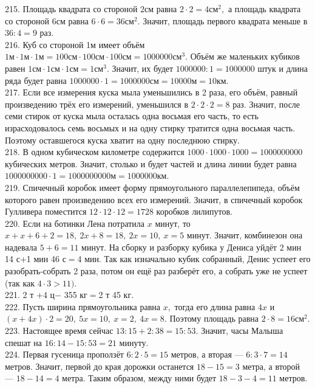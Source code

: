 215. Площадь квадрата со стороной 2см равна $2\cdot2=4\text{см}^2,$ а площадь квадрата со стороной 6см равна $6\cdot6=36\text{см}^2.$ Значит, площадь первого квадрата меньше в $36:4=9$ раз.\\
216. Куб со стороной 1м имеет объём $1\text{м}\cdot1\text{м}\cdot1\text{м}=100\text{см}\cdot100\text{см}\cdot100\text{см}=1000000\text{см}^3.$ Объём же маленьких кубиков равен $1\text{см}\cdot1\text{см}\cdot1\text{см}=1\text{см}^3.$ Значит, их будет $1000000:1=1000000$ штук и длина ряда будет равна
$1000000\cdot1=1000000\text{см}=10000\text{м}=10$км.\\
217. Если все измерения куска мыла уменьшились в 2 раза, его объём, равный произведению трёх его измерений, уменьшился в $2\cdot2\cdot2=8$ раз. Значит, после семи стирок от куска мыла осталась одна восьмая его часть, то есть израсходовалось семь восьмых и на одну стирку тратится одна восьмая часть. Поэтому оставшегося куска хватит на одну последнюю стирку.\\
218. В одном кубическом километре содержится $1000\cdot1000\cdot1000=1000000000$ кубических метров. Значит, столько и будет частей и длина линии будет равна $1000000000\cdot1=1000000000$м$=1000000$км.\\
219. Спичечный коробок имеет форму прямоугольного параллелепипеда, объём которого равен произведению всех его измерений. Значит, в спичечный коробок Гулливера поместится $12\cdot12\cdot12=1728$ коробков лилипутов.\\
220. Если на ботинки Лена потратила $x$ минут, то  $x+x+6+2=18,\ 2x+8=18,\ 2x=10,\ x=5$ минут. Значит, комбинезон она надевала $5+6=11$ минут. На сборку и разборку кубика у Дениса уйдёт 2 мин 14 с$+$1 мин 46 с$=$4 мин. Так как изначально кубик собранный, Денис успеет его разобрать-собрать 2 раза, потом он ещё раз разберёт его, а собрать уже не успеет (так как $4\cdot3>11).$\\
221. 2 т $+$4 ц$-$ 355 кг$=$2 т 45 кг.\\
222. Пусть ширина прямоугольника равна $x,$ тогда его длина равна $4x$ и $(x+4x)\cdot2=20,\ 5x=10,\ x=2,\ 4x=8.$ Поэтому площадь равна $2\cdot8=16\text{см}^2.$\\
223. Настоящее время сейчас $13:15+2:38=15:53.$ Значит, часы Малыша спешат на $16:14-15:53=21$ минуту.\\
224. Первая гусеница проползёт $6:2\cdot5=15$ метров, а вторая --- $6:3\cdot7=14$ метров. Значит, первой до края дорожки останется $18-15=3$ метра, а второй --- $18-14=4$ метра. Таким образом, между ними будет $18-3-4=11$ метров.\\

